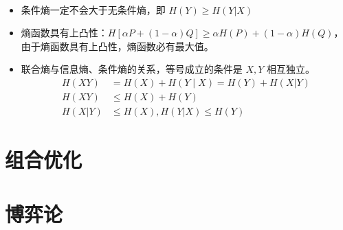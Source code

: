 \begin{remark}
\begin{itemize}
\begin{gather*}
        \end{gather*}
        \item 条件熵一定不会大于无条件熵，即 $H(Y) \ge H(Y | X)$
        \item 熵函数具有上凸性：$H[\alpha P + (1 - \alpha)Q] \ge \alpha H(P) + (1 - \alpha)H(Q)$，由于熵函数具有上凸性，熵函数必有最大值。
        \item 联合熵与信息熵、条件熵的关系，等号成立的条件是 $X,Y$ 相互独立。\begin{align*}
            H(X Y)&=H(X)+H(Y \mid X)=H(Y)+H(X | Y) \\
            H(X Y) &\leq H(X)+H(Y) \\
            H(X | Y) &\leq H(X), H(Y | X) \leq H(Y)
        \end{align*}
    \end{itemize}
\end{remark}

\section{组合优化}

\section{博弈论}


